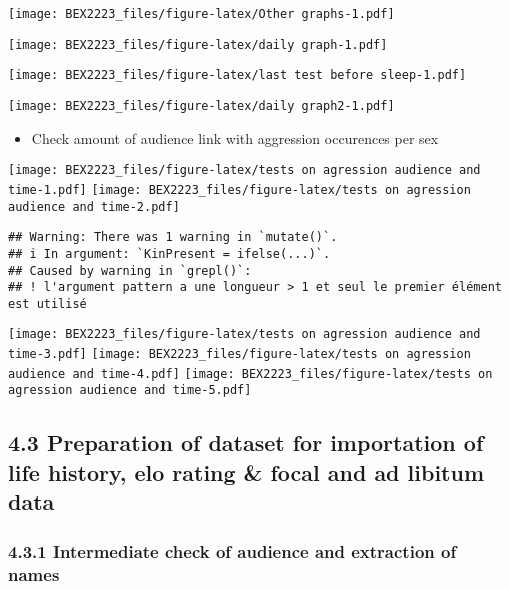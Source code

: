 \documentclass[
]{article}
\providecommand{\tightlist}{%
  \setlength{\itemsep}{0pt}\setlength{\parskip}{0pt}}
\begin{document}
\texttt{[image: BEX2223\_files/figure-latex/Other graphs-1.pdf]}

\texttt{[image: BEX2223\_files/figure-latex/daily graph-1.pdf]}

\texttt{[image: BEX2223\_files/figure-latex/last test before sleep-1.pdf]}

\texttt{[image: BEX2223\_files/figure-latex/daily graph2-1.pdf]}

\begin{itemize}
\tightlist
\item
  Check amount of audience link with aggression occurences per sex
\end{itemize}

\texttt{[image: BEX2223\_files/figure-latex/tests on agression audience and time-1.pdf]}
\texttt{[image: BEX2223\_files/figure-latex/tests on agression audience and time-2.pdf]}

\begin{verbatim}
## Warning: There was 1 warning in `mutate()`.
## i In argument: `KinPresent = ifelse(...)`.
## Caused by warning in `grepl()`:
## ! l'argument pattern a une longueur > 1 et seul le premier élément est utilisé
\end{verbatim}

\texttt{[image: BEX2223\_files/figure-latex/tests on agression audience and time-3.pdf]}
\texttt{[image: BEX2223\_files/figure-latex/tests on agression audience and time-4.pdf]}
\texttt{[image: BEX2223\_files/figure-latex/tests on agression audience and time-5.pdf]}

\hypertarget{preparation-of-dataset-for-importation-of-life-history-elo-rating-focal-and-ad-libitum-data}{%
\subsection{4.3 Preparation of dataset for importation of life history,
elo rating \& focal and ad libitum
data}\label{preparation-of-dataset-for-importation-of-life-history-elo-rating-focal-and-ad-libitum-data}}

\hypertarget{intermediate-check-of-audience-and-extraction-of-names}{%
\subsubsection{4.3.1 Intermediate check of audience and extraction of
names}\label{intermediate-check-of-audience-and-extraction-of-names}}
\end{document}
